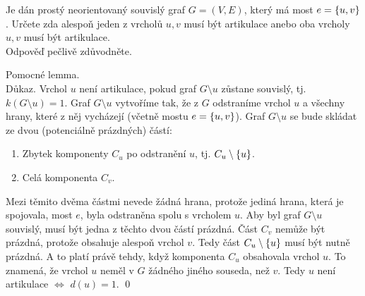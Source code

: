 \documentclass[11pt,a4paper]{article}
\begin{document}
\title{}
\author{Jakub Adamec\\XP01TGR}

\maketitle

\begin{exercise}
Je dán prostý neorientovaný souvislý graf $G = (V,E)$, který má most $e = \left\lbrace u,v \right\rbrace$. Určete zda alespoň jeden z vrcholů
$u,v$ musí být artikulace anebo oba vrcholy $u,v$ musí být artikulace.\\
Odpověď pečlivě zdůvodněte.
\end{exercise}
\begin{solution}
Pomocné lemma. \\
Důkaz. Vrchol $u$ není artikulace, pokud graf $G \setminus u$ zůstane souvislý, tj. $k(G \setminus u) = 1$. Graf 
$G \setminus u$ vytvoříme tak, že z $G$ odstraníme vrchol $u$ a všechny hrany, které z něj vycházejí (včetně mostu 
$e = \left\lbrace u,v \right\rbrace$). Graf $G \setminus u$ se bude skládat ze dvou (potenciálně prázdných) částí:
\begin{enumerate}[(1), noitemsep]
    \item Zbytek komponenty $C_u$ po odstranění $u$, tj. $C_u \setminus \left\lbrace u \right\rbrace$.
    \item Celá komponenta $C_v$.
\end{enumerate}
Mezi těmito dvěma částmi nevede žádná hrana, protože jediná hrana, která je spojovala, most $e$, byla odstraněna spolu s 
vrcholem $u$. Aby byl graf $G \setminus u$ souvislý, musí být jedna z těchto dvou částí prázdná.  Část $C_v$ nemůže být 
prázdná, protože obsahuje alespoň vrchol $v$.  Tedy část $C_u \setminus \left\lbrace u \right\rbrace$ musí být nutně prázdná. A to platí právě 
tehdy, když komponenta $C_u$ obsahovala  vrchol $u$. To znamená, že vrchol $u$ neměl v $G$ žádného jiného 
souseda, než $v$. Tedy $u$ není artikulace $\iff$ $d(u)=1$. 
\hspace{\fill}\qed 


\end{solution}
\end{document}
